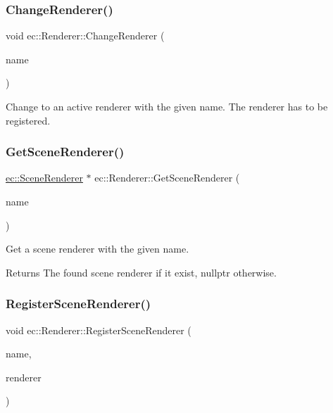\subsubsection{\texorpdfstring{Change\+Renderer()}{ChangeRenderer()}}
{\footnotesize\ttfamily void ec\+::\+Renderer\+::\+Change\+Renderer (\begin{DoxyParamCaption}\item[{const std\+::string \&}]{name }\end{DoxyParamCaption})}

Change to an active renderer with the given name. The renderer has to be registered. \mbox{\label{classec_1_1_renderer_adc19ec1ee2a41ac4229a75d18c0dc60a}} 
\subsubsection{\texorpdfstring{Get\+Scene\+Renderer()}{GetSceneRenderer()}}
{\footnotesize\ttfamily \mbox{\hyperlink{classec_1_1_scene_renderer}{ec\+::\+Scene\+Renderer}} $\ast$ ec\+::\+Renderer\+::\+Get\+Scene\+Renderer (\begin{DoxyParamCaption}\item[{const std\+::string \&}]{name }\end{DoxyParamCaption})}

Get a scene renderer with the given name. \begin{DoxyReturn}{Returns}
The found scene renderer if it exist, nullptr otherwise. 
\end{DoxyReturn}
\mbox{\label{classec_1_1_renderer_a74fb04d7d75703f5fe018a806fa82d0e}} 
\subsubsection{\texorpdfstring{Register\+Scene\+Renderer()}{RegisterSceneRenderer()}}
{\footnotesize\ttfamily void ec\+::\+Renderer\+::\+Register\+Scene\+Renderer (\begin{DoxyParamCaption}\item[{const std\+::string \&}]{name,  }\item[{\mbox{\hyperlink{classec_1_1_scene_renderer}{Scene\+Renderer}} $\ast$}]{renderer }\end{DoxyParamCaption})}

